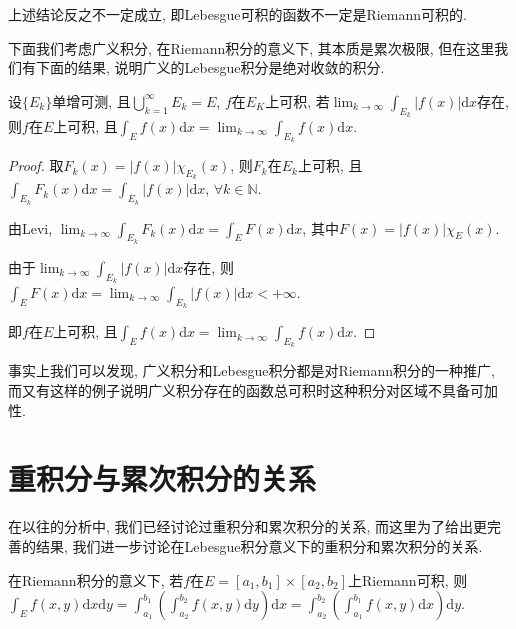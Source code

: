 \documentclass[theorem=false,mathfont=none,openany,sub3section]{easybook}
\begin{document}
\begin{remark}
  上述结论反之不一定成立, 即Lebesgue可积的函数不一定是Riemann可积的.\par
\end{remark}

下面我们考虑广义积分, 在Riemann积分的意义下, 其本质是累次极限, 但在这里我们有下面的结果, 说明广义的Lebesgue积分是绝对收敛的积分.\par

\begin{theorem}
  设$\{E_k\}$单增可测, 且$\bigcup_{k=1}^{\infty}E_k=E$, $f$在$E_K$上可积, 若$\lim_{k \to \infty}\int_{E_k}|f(x)|\mathrm{d}x$存在, 则$f$在$E$上可积, 且$\int_{E}f(x)\mathrm{d}x=\lim_{k \to \infty}\int_{E_k}f(x)\mathrm{d}x$.\par
\end{theorem}

\begin{proof}
  取$F_k(x)=|f(x)|\chi_{E_k}(x)$, 则$F_k$在$E_k$上可积, 且$\int_{E_k}F_k(x)\mathrm{d}x=\int_{E_k}|f(x)|\mathrm{d}x$, $\forall k\in \mathbb{N}$.\par
  由Levi, $\lim_{k \to \infty}\int_{E_k}F_k(x)\mathrm{d}x=\int_{E}F(x)\mathrm{d}x$, 其中$F(x)=|f(x)|\chi_{E}(x)$.\par
  由于$\lim_{k \to \infty}\int_{E_k}|f(x)|\mathrm{d}x$存在, 则$\int_{E}F(x)\mathrm{d}x=\lim_{k \to \infty}\int_{E_k}|f(x)|\mathrm{d}x<+\infty$.\par
  即$f$在$E$上可积, 且$\int_{E}f(x)\mathrm{d}x=\lim_{k \to \infty}\int_{E_k}f(x)\mathrm{d}x$.\par
\end{proof}

\begin{remark}
  事实上我们可以发现, 广义积分和Lebesgue积分都是对Riemann积分的一种推广, 而又有这样的例子说明广义积分存在的函数总可积时这种积分对区域不具备可加性.\par
\end{remark}

\newpage

\section{重积分与累次积分的关系}

在以往的分析中, 我们已经讨论过重积分和累次积分的关系, 而这里为了给出更完善的结果, 我们进一步讨论在Lebesgue积分意义下的重积分和累次积分的关系.\par

\begin{theorem}
  在Riemann积分的意义下, 若$f$在$E=\left[a_1,b_1\right]\times \left[a_2,b_2\right]$上Riemann可积, 则$\int_{E}f(x,y)\mathrm{d}x\mathrm{d}y=\int_{a_1}^{b_1}\left(\int_{a_2}^{b_2}f(x,y)\mathrm{d}y\right)\mathrm{d}x=\int_{a_2}^{b_2}\left(\int_{a_1}^{b_1}f(x,y)\mathrm{d}x\right)\mathrm{d}y$.\par
\end{theorem}
\end{document}
